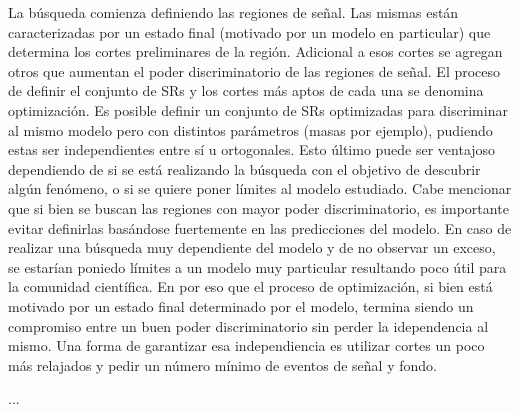 La búsqueda comienza definiendo las regiones de señal. Las mismas están caracterizadas por un estado final (motivado por un modelo en particular) que determina los cortes preliminares de la región. Adicional a esos cortes se agregan otros que aumentan el poder discriminatorio de las regiones de señal. El proceso de definir el conjunto de SRs y los cortes más aptos de cada una se denomina optimización. Es posible definir un conjunto de SRs optimizadas para discriminar al mismo modelo pero con distintos parámetros (masas por ejemplo), pudiendo estas ser independientes entre sí u ortogonales. Esto último puede ser ventajoso dependiendo de si se está realizando la búsqueda con el objetivo de descubrir algún fenómeno, o si se quiere poner límites al modelo estudiado. Cabe mencionar que si bien se buscan las regiones con mayor poder discriminatorio, es importante evitar definirlas basándose fuertemente en las predicciones del modelo. En caso de realizar una búsqueda muy dependiente del modelo y de no observar un exceso, se estarían poniedo límites a un modelo muy particular resultando poco útil para la comunidad científica. En por eso que el proceso de optimización, si bien está motivado por un estado final determinado por el modelo, termina siendo un compromiso entre un buen poder discriminatorio sin perder la idependencia al mismo. Una forma de garantizar esa independiencia es utilizar cortes un poco más relajados y pedir un número mínimo de eventos de señal y fondo.

...


